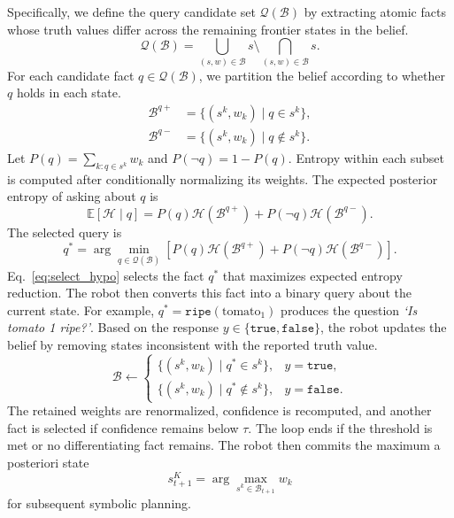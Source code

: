 Specifically, we define the query candidate set $\mathcal{Q}(\mathcal{B})$ by extracting atomic facts whose truth values differ across the remaining frontier states in the belief. 
\[
\mathcal{Q}(\mathcal{B})
=
\bigcup_{(s,w)\in\mathcal{B}}s
\setminus
\bigcap_{(s,w)\in\mathcal{B}}s.
\]
For each candidate fact $q\in\mathcal{Q}(\mathcal{B})$, we partition the belief according to whether $q$ holds in each state.
\[
\begin{aligned}
\mathcal{B}^{q+}&=\{(s^k,w_k)\mid q\in s^k\},\\
\mathcal{B}^{q-}&=\{(s^k,w_k)\mid q\notin s^k\}.
\end{aligned}
\]
Let $P(q)=\sum_{k:q\in s^k}w_k$ and $P(\neg q)=1-P(q)$. Entropy within each subset is computed after conditionally normalizing its weights. The expected posterior entropy of asking about $q$ is
\[
\mathbb{E}[\mathcal{H}\mid q]
=
P(q)\mathcal{H}(\mathcal{B}^{q+})
+
P(\neg q)\mathcal{H}(\mathcal{B}^{q-}).
\]
The selected query is
\begin{equation}
q^*
=
\arg\min_{q\in\mathcal{Q}(\mathcal{B})}
\left[
P(q)\mathcal{H}(\mathcal{B}^{q+})
+
P(\neg q)\mathcal{H}(\mathcal{B}^{q-})
\right].
\label{eq:select_hypo}
\end{equation}
Eq.~\ref{eq:select_hypo} selects the fact $q^*$ that maximizes expected entropy reduction. The robot then converts this fact into a binary query about the current state. For example, $q^*=\texttt{ripe}(\text{tomato}_1)$ produces the question \textit{`Is tomato 1 ripe?'}. Based on the response $y\in\{\texttt{true},\texttt{false}\}$, the robot updates the belief by removing states inconsistent with the reported truth value.
\begin{equation}
\mathcal{B}
\leftarrow
\begin{cases}
\{(s^k,w_k)\mid q^*\in s^k\}, & y=\texttt{true},\\
\{(s^k,w_k)\mid q^*\notin s^k\}, & y=\texttt{false}.
\end{cases}
\label{eq:filter}
\end{equation}
The retained weights are renormalized, confidence is recomputed, and another fact is selected if confidence remains below $\tau$. The loop ends if the threshold is met or no differentiating fact remains. The robot then commits the maximum a posteriori state
\[
s_{t+1}^{K}
=
\arg\max_{s^k\in\mathcal{B}_{t+1}}w_k
\]
for subsequent symbolic planning.


